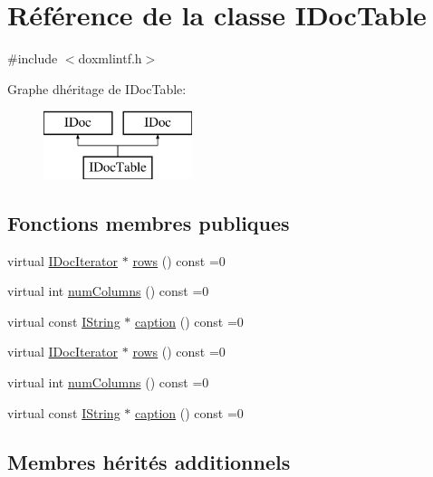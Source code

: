 \hypertarget{class_i_doc_table}{}\section{Référence de la classe I\+Doc\+Table}
\label{class_i_doc_table}


{\ttfamily \#include $<$doxmlintf.\+h$>$}

Graphe d\textquotesingle{}héritage de I\+Doc\+Table\+:\begin{figure}[H]
\begin{center}
\leavevmode
\includegraphics[height=2.000000cm]{class_i_doc_table}
\end{center}
\end{figure}
\subsection*{Fonctions membres publiques}
\begin{DoxyCompactItemize}
\item 
virtual \hyperlink{class_i_doc_iterator}{I\+Doc\+Iterator} $\ast$ \hyperlink{class_i_doc_table_a96754e7e5fbe31f3eb42c6d1687c93de}{rows} () const  =0
\item 
virtual int \hyperlink{class_i_doc_table_ade29c3723248d4d2113ae3959fb49b8f}{num\+Columns} () const  =0
\item 
virtual const \hyperlink{class_i_string}{I\+String} $\ast$ \hyperlink{class_i_doc_table_aba3b331d25528dac3852db1b40a7e3e6}{caption} () const  =0
\item 
virtual \hyperlink{class_i_doc_iterator}{I\+Doc\+Iterator} $\ast$ \hyperlink{class_i_doc_table_a96754e7e5fbe31f3eb42c6d1687c93de}{rows} () const  =0
\item 
virtual int \hyperlink{class_i_doc_table_ade29c3723248d4d2113ae3959fb49b8f}{num\+Columns} () const  =0
\item 
virtual const \hyperlink{class_i_string}{I\+String} $\ast$ \hyperlink{class_i_doc_table_aba3b331d25528dac3852db1b40a7e3e6}{caption} () const  =0
\end{DoxyCompactItemize}
\subsection*{Membres hérités additionnels}


